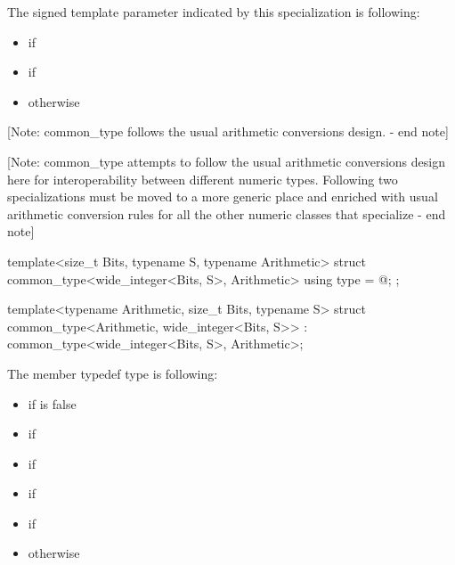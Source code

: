 \begin{addedblock}
The signed template parameter indicated by this specialization is following:

\begin{itemize}
\item {} if 
\item {} if 
\item {} otherwise
\end{itemize}

[Note: common_type follows the usual arithmetic conversions design. - end note]

[Note: common_type attempts to follow the usual arithmetic conversions design here for interoperability between different numeric types. Following two specializations must be moved to a more generic place and enriched with usual arithmetic conversion rules for all the other numeric classes that specialize - end note]

\begin{itemdecl}
template<size_t Bits, typename S, typename Arithmetic>
struct common_type<wide_integer<Bits, S>, Arithmetic> {
    using type = @\seebelow@;
};

template<typename Arithmetic, size_t Bits, typename S>
struct common_type<Arithmetic, wide_integer<Bits, S>>
: common_type<wide_integer<Bits, S>, Arithmetic>;
\end{itemdecl}

The member typedef type is following:

\begin{itemize}
\item {} if  is false
\item {} if 
\item {} if 
\item {} if 
\item {} if 
\item {} otherwise
\end{itemize}


\end{addedblock}
